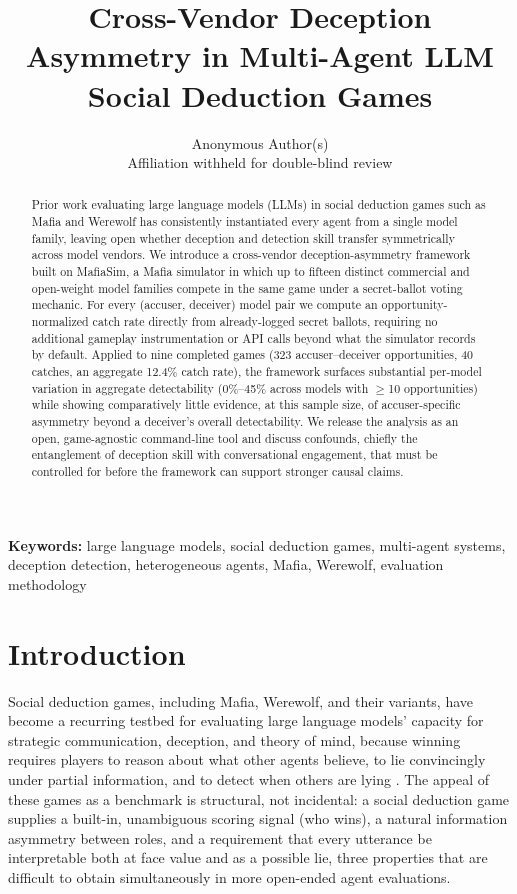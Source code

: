\documentclass{article}
\title{Cross-Vendor Deception Asymmetry in Multi-Agent LLM Social Deduction Games}
\author{
  Anonymous Author(s) \\
  Affiliation withheld for double-blind review
}
\begin{document}
\maketitle

\begin{abstract}
Prior work evaluating large language models (LLMs) in social deduction games such as Mafia and Werewolf has consistently instantiated every agent from a single model family, leaving open whether deception and detection skill transfer symmetrically across model vendors. We introduce a cross-vendor deception-asymmetry framework built on MafiaSim, a Mafia simulator in which up to fifteen distinct commercial and open-weight model families compete in the same game under a secret-ballot voting mechanic. For every (accuser, deceiver) model pair we compute an opportunity-normalized catch rate directly from already-logged secret ballots, requiring no additional gameplay instrumentation or API calls beyond what the simulator records by default. Applied to nine completed games (323 accuser--deceiver opportunities, 40 catches, an aggregate 12.4\% catch rate), the framework surfaces substantial per-model variation in aggregate detectability (0\%--45\% across models with $\geq$10 opportunities) while showing comparatively little evidence, at this sample size, of accuser-specific asymmetry beyond a deceiver's overall detectability. We release the analysis as an open, game-agnostic command-line tool and discuss confounds, chiefly the entanglement of deception skill with conversational engagement, that must be controlled for before the framework can support stronger causal claims.
\end{abstract}

\textbf{Keywords:} large language models, social deduction games, multi-agent systems, deception detection, heterogeneous agents, Mafia, Werewolf, evaluation methodology

\section{Introduction}
\label{sec:intro}

Social deduction games, including Mafia, Werewolf, and their variants, have become a recurring testbed for evaluating large language models' capacity for strategic communication, deception, and theory of mind, because winning requires players to reason about what other agents believe, to lie convincingly under partial information, and to detect when others are lying \citep{eckhaus2025time,feng2024survey,song2025beyond}. The appeal of these games as a benchmark is structural, not incidental: a social deduction game supplies a built-in, unambiguous scoring signal (who wins), a natural information asymmetry between roles, and a requirement that every utterance be interpretable both at face value and as a possible lie, three properties that are difficult to obtain simultaneously in more open-ended agent evaluations.
\end{document}

